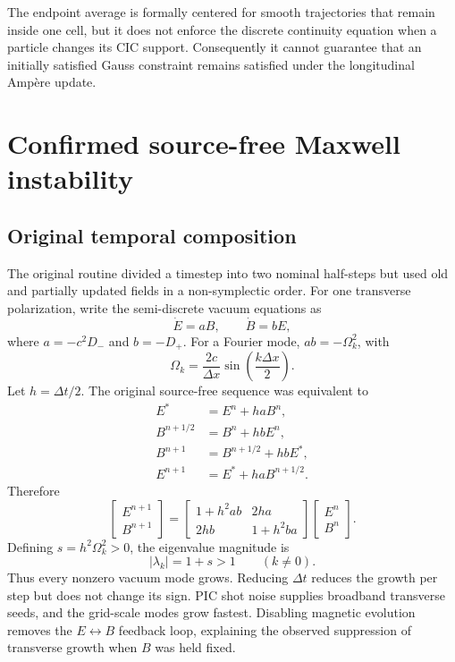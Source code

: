 \documentclass[11pt,a4paper]{article}
\begin{document}
The endpoint average is formally centered for smooth trajectories that remain
inside one cell, but it does not enforce the discrete continuity equation when
a particle changes its CIC support.  Consequently it cannot guarantee that an
initially satisfied Gauss constraint remains satisfied under the longitudinal
Amp\`ere update.

\section{Confirmed source-free Maxwell instability}
\label{sec:maxwell-instability}

\subsection{Original temporal composition}

The original routine divided a timestep into two nominal half-steps but used
old and partially updated fields in a non-symplectic order.  For one transverse
polarization, write the semi-discrete vacuum equations as
\begin{equation}
  \dot E=aB,\qquad \dot B=bE,
\end{equation}
where $a=-c^2D_-$ and $b=-D_+$.  For a Fourier mode,
$ab=-\Omega_k^2$, with
\begin{equation}
  \Omega_k = \frac{2c}{\Delta x}
  \sin\left(\frac{k\Delta x}{2}\right).
\end{equation}
Let $h=\Delta t/2$.  The original source-free sequence was equivalent to
\begin{align}
  E^* &= E^n+h aB^n,\\
  B^{n+1/2} &= B^n+h bE^n,\\
  B^{n+1} &= B^{n+1/2}+h bE^*,\\
  E^{n+1} &= E^*+h aB^{n+1/2}.
\end{align}
Therefore
\begin{equation}
\begin{bmatrix}E^{n+1}\\B^{n+1}\end{bmatrix}
=
\begin{bmatrix}
1+h^2ab & 2ha\\
2hb & 1+h^2ba
\end{bmatrix}
\begin{bmatrix}E^n\\B^n\end{bmatrix}.
\end{equation}
Defining $s=h^2\Omega_k^2>0$, the eigenvalue magnitude is
\begin{equation}
  |\lambda_k|=1+s>1\qquad(k\ne0).
\end{equation}
Thus every nonzero vacuum mode grows.  Reducing $\Delta t$ reduces the growth
per step but does not change its sign.  PIC shot noise supplies broadband
transverse seeds, and the grid-scale modes grow fastest.  Disabling magnetic
evolution removes the $E\leftrightarrow B$ feedback loop, explaining the
observed suppression of transverse growth when $B$ was held fixed.
\end{document}

